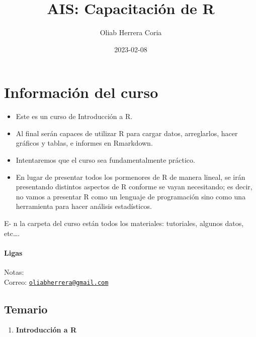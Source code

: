 \documentclass[
]{book}
\title{AIS: Capacitación de R}
\author{Oliab Herrera Coria}
\date{2023-02-08}
\providecommand{\tightlist}{%
  \setlength{\itemsep}{0pt}\setlength{\parskip}{0pt}}
\begin{document}
\maketitle

{
\setcounter{tocdepth}{1}
\tableofcontents
}
\hypertarget{informaciuxf3n-del-curso}{%
\chapter*{Información del curso}\label{informaciuxf3n-del-curso}}

\begin{itemize}
\item
  Este es un curso de Introducción a R.
\item
  Al final serán capaces de utilizar R para cargar datos, arreglarlos, hacer gráficos y tablas, e informes en Rmarkdown.
\item
  Intentaremos que el curso sea fundamentalmente práctico.
\item
  En lugar de presentar todos los pormenores de R de manera lineal, se irán presentando distintos aspectos de R conforme se vayan necesitando; es decir, no vamos a presentar R como un lenguaje de programación sino como una herramienta para hacer análisis estadísticos.
\end{itemize}

E- n la carpeta del curso están todos los materiales: tutoriales, algunos datos, etc\ldots.

\hypertarget{ligas}{%
\subsubsection*{Ligas}\label{ligas}}

Notas:\\
Correo: \href{mailto:oliabherrera@gmail.com}{\nolinkurl{oliabherrera@gmail.com}}

\hypertarget{temario}{%
\section*{Temario}\label{temario}}

\begin{enumerate}
\def\labelenumi{\arabic{enumi}.}
\tightlist
\item
  \textbf{Introducción a R}
\end{enumerate}
\end{document}
